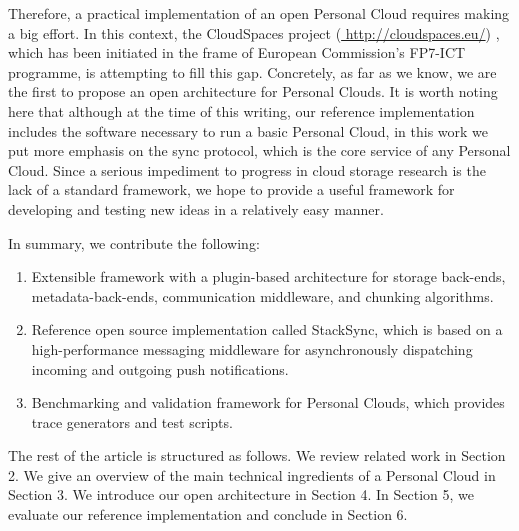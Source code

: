 Therefore, a practical implementation of an open Personal Cloud requires making a big effort. In 
this context, the CloudSpaces project (\url{ http://cloudspaces.eu/}) , which has been initiated
in the frame of European Commission's FP7-ICT programme, is attempting to fill this gap. Concretely,
as far as we know, we are the first to propose an open architecture for Personal Clouds. It is worth
noting here that although at the time of this writing, our reference implementation includes the
software necessary to run a basic Personal Cloud, in this work we put more emphasis on the sync protocol, which
is the core service of any Personal Cloud. Since a serious impediment to progress in cloud storage
research is the lack of a standard framework, we hope to provide a useful framework for developing
and testing new ideas in a relatively easy manner.

In summary, we contribute the following:

\begin{enumerate}
\item Extensible framework with a plugin-based architecture for  storage back-ends, metadata-back-ends,
 communication middleware, and chunking  algorithms.
\item Reference open source implementation called StackSync, which is based on a high-performance messaging middleware 
for asynchronously dispatching incoming and outgoing push notifications.
\item Benchmarking and validation framework for Personal Clouds, which provides trace generators and test scripts. 

\end{enumerate}


The rest of the article is structured as follows. We review related work in Section 2. We give an
overview of the main technical ingredients of a Personal Cloud in Section 3. We introduce our 
open architecture in Section 4. In Section 5, we evaluate our reference implementation and conclude
in Section 6.